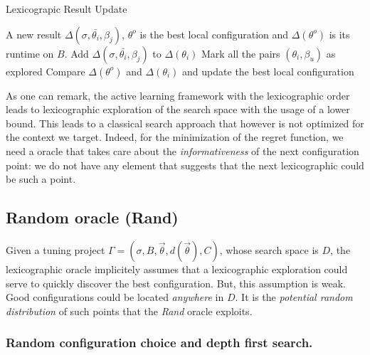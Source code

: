 \documentclass[10pt, conference, compsocconf]{IEEEtran}
\begin{document}
	\begin{algorithm}                    
	\caption{\scriptsize Lexicograpic Result Update } 	\label{alg1}  
	\begin{algorithmic}[1]
	\scriptsize
         A new result  $\Delta(\sigma, \bar{\theta_i}, \beta_j)$, 
         $\theta^o$ is the best local configuration and $\Delta(\theta^o)$ is its runtime on $B$.
        \STATE Add $\Delta(\sigma, \bar{\theta_i}, \beta_j)$ to $\Delta(\theta_i)$
        \STATE Mark all the pairs $(\theta_i, \beta_u)$ as explored
        \ELSE
        \STATE Compare $\Delta(\theta^o)$ and $\Delta(\theta_i)$ and update the best local configuration
        \ENDIF
	\ENDIF
	\end{algorithmic}
	\end{algorithm}
	\normalsize

        As one can remark, the active learning framework with the
        lexicographic order leads to lexicographic exploration of the
        search space with the usage of a lower bound. This leads to a
        classical search approach that however is not optimized for
        the context we target. Indeed, for the minimization of the
        regret function, we need a oracle that takes care about the
        {\it informativeness} of the next configuration point: we do
        not have any element that suggests that the next lexicographic
        could be such a point.

\subsection{Random  oracle (Rand)}

Given a tuning project
$\Gamma = (\sigma, B, \vec{\theta}, d(\vec{\theta}), C)$, whose search
space is $D$, the lexicographic oracle implicitely assumes that a
lexicographic exploration could serve to quickly discover the best
configuration. But, this assumption is weak. Good configurations could
be located {\it anywhere} in $D$. It is the {\it potential random
  distribution} of such points that the {\it Rand} oracle exploits.
 
\subsubsection{ Random configuration choice and depth first search.} 
\end{document}
